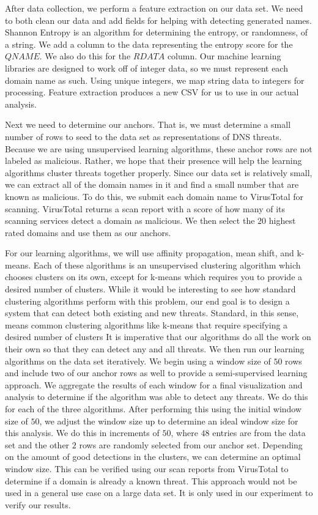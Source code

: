 After data collection, we perform a feature extraction on our data set.
We need to both clean our data and add fields for helping with detecting generated names.
Shannon Entropy is an algorithm for determining the entropy, or randomness, of a string.
We add a column to the data representing the entropy score for the $QNAME$.
We also do this for the $RDATA$ column.
Our machine learning libraries are designed to work off of integer data, so we must represent each
domain name as such.
Using unique integers, we map string data to integers for processing.
Feature extraction produces a new CSV for us to use in our actual analysis.

Next we need to determine our anchors.
That is, we must determine a small number of rows to seed to the data set as representations of
DNS threats.
Because we are using unsupervised learning algorithms, these anchor rows are not labeled as malicious.
Rather, we hope that their presence will help the learning algorithms cluster threats together properly.
Since our data set is relatively small, we can extract all of the domain names in it and find
a small number that are known as malicious.
To do this, we submit each domain name to VirusTotal for scanning.
VirusTotal returns a scan report with a score of how many of its scanning services detect a domain
as malicious.
We then select the $20$ highest rated domains and use them as our anchors.

For our learning algorithms, we will use affinity propagation, mean shift, and k-means.
Each of these algorithms is an unsupervised clustering algorithm which chooses clusters on its own,
except for k-means which requires you to provide a desired number of clusters.
While it would be interesting to see how standard clustering algorithms perform with this problem,
our end goal is to design a system that can detect both existing and new threats.
Standard, in this sense, means common clustering algorithms like k-means that require specifying
a desired number of clusters
It is imperative that our algorithms do all the work on their own so that they can detect any and
all threats.
We then run our learning algorithms on the data set iteratively.
We begin using a window size of $50$ rows and include two of our anchor rows as well to provide
a semi-supervised learning approach.
We aggregate the results of each window for a final visualization and analysis to determine if
the algorithm was able to detect any threats.
We do this for each of the three algorithms.
After performing this using the initial window size of $50$, we adjust the window size up to
determine an ideal window size for this analysis.
We do this in increments of $50$, where $48$ entries are from the data set and the other $2$ rows
are randomly selected from our anchor set.
Depending on the amount of good detections in the clusters, we can determine an optimal window size.
This can be verified using our scan reports from VirusTotal to determine if a domain is already a
known threat.
This approach would not be used in a general use case on a large data set.
It is only used in our experiment to verify our results.

